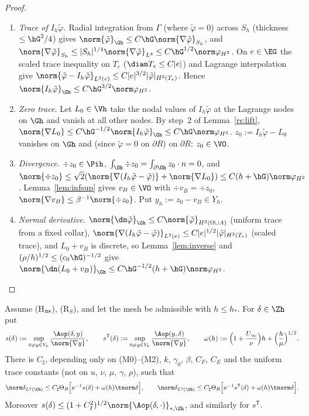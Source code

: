 \begin{proof}
\begin{enumerate}
\item \emph{Trace of $I_h\tilde\varphi$.} Radial integration from $\Gamma$ (where $\tilde\varphi=0$) across $S_h$ (thickness $\le\hG^2/4$) gives
$\norm{\tilde\varphi}_{\Gh}\le C\hG\norm{\nabla\tilde\varphi}_{S_h}$, and $\norm{\nabla\tilde\varphi}_{S_h}\le|S_h|^{1/4}\norm{\nabla\tilde\varphi}_{L^4}\le C\hG^{1/2}\norm\varphi_{H^2}$.
On $e\in\EG$ the scaled trace inequality on $T_e$ ($\diam T_e\le C|e|$) and Lagrange interpolation give
$\norm{\tilde\varphi-I_h\tilde\varphi}_{L^2(e)}\le C|e|^{3/2}|\tilde\varphi|_{H^2(T_e)}$. Hence $\norm{I_h\tilde\varphi}_{\Gh}\le C\hG^{3/2}\norm\varphi_{H^2}$.
\item \emph{Zero trace.} Let $L_0\in\Vh$ take the nodal values of $I_h\tilde\varphi$ at the Lagrange nodes on $\Gh$ and vanish at all other nodes.
By step~2 of Lemma~\ref{rs:lift}, $\norm{\nabla L_0}\le C\hG^{-1/2}\norm{I_h\tilde\varphi}_{\Gh}\le C\hG\norm\varphi_{H^2}$. $z_0:=I_h\tilde\varphi-L_0$
vanishes on $\Gh$ and (since $\tilde\varphi=0$ on $\partial R$) on $\partial R$: $z_0\in\VO$.
\item \emph{Divergence.} $\div z_0\in\Pih$, $\int_{\Oh}\div z_0=\int_{\partial\Oh}z_0\cdot n=0$, and
$\norm{\div z_0}\le\sqrt2(\norm{\nabla(I_h\tilde\varphi-\tilde\varphi)}+\norm{\nabla L_0})\le C(h+\hG)\norm\varphi_{H^2}$. Lemma~\ref{lem:infsup} gives
$v_B\in\VO$ with $\div v_B=\div z_0$, $\norm{\nabla v_B}\le\beta^{-1}\norm{\div z_0}$. Put $y_h:=z_0-v_B\in Y_h$.
\item \emph{Normal derivative.} $\norm{\dn\tilde\varphi}_{\Gh}\le C\norm{\tilde\varphi}_{H^2(\Omega\cup A)}$ (uniform trace from a fixed collar),
$\norm{\nabla(I_h\tilde\varphi-\tilde\varphi)}_{L^2(e)}\le C|e|^{1/2}|\tilde\varphi|_{H^2(T_e)}$ (scaled trace), and $L_0+v_B$ is discrete, so
Lemma~\ref{lem:inverse} and $(\rho/h)^{1/2}\le(c_0\hG)^{-1/2}$ give $\norm{\dn(L_0+v_B)}_{\Gh}\le C\hG^{-1/2}(h+\hG)\norm\varphi_{H^2}$.\qedhere
\end{enumerate}
\end{proof}

\begin{lemma}\label{n2:dual}
Assume (H$_{\rm ns}$), (R$_S$), and let the mesh be admissible with $h\le h_\ast$. For $\delta\in\Zh$ put
\[
s(\delta):=\sup_{0\ne y\in Y_h}\frac{\Aop(\delta,y)}{\norm{\nabla y}},\qquad s^{\mathsf T}(\delta):=\sup_{0\ne y\in Y_h}\frac{\Aop(y,\delta)}{\norm{\nabla y}},\qquad
\omega(h):=\Bigl(1+\frac{U_\infty}\nu\Bigr)h+\Bigl(\frac h\mu\Bigr)^{1/2}.
\]
There is $C_\sharp$, depending only on (M0)--(M2), $k$, $\gamma_0$, $\beta$, $C_F$, $C_E$ and the uniform trace constants (not on $u$, $\nu$,
$\mu$, $\gamma$, $\rho$), such that
\[
\norm\delta_{L^2(\Oh)}\le C_\sharp\Theta_R\Bigl[\nu^{-1}s(\delta)+\omega(h)\tnorm\delta\Bigr],\qquad
\norm\delta_{L^2(\Oh)}\le C_\sharp\Theta_R\Bigl[\nu^{-1}s^{\mathsf T}(\delta)+\omega(h)\tnorm\delta\Bigr].
\]
Moreover $s(\delta)\le(1+C_I^2)^{1/2}\norm{\Aop(\delta,\cdot)}_{\ast,\Zh}$, and similarly for $s^{\mathsf T}$.
\end{lemma}

